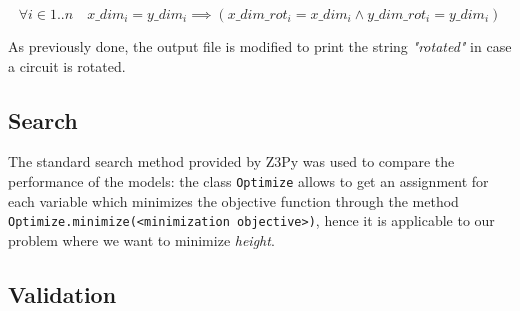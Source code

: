 \begin{equation*}
     \forall i \in {1..n} \quad x\_dim_i = y\_dim_i \implies (x\_dim\_rot_i = x\_dim_i \land y\_dim\_rot_i = y\_dim_i)
\end{equation*}

As previously done, the output file is modified to print the string \textit{"rotated"} in case a circuit is rotated. 

\subsection{Search}

The standard search method provided by Z3Py was used to compare the performance of the models: the class \verb|Optimize| allows to get an assignment for each variable which minimizes the objective function through the method \verb|Optimize.minimize(<minimization objective>)|, hence it is applicable to our problem where we want to minimize \textit{height}.

\subsection{Validation}

